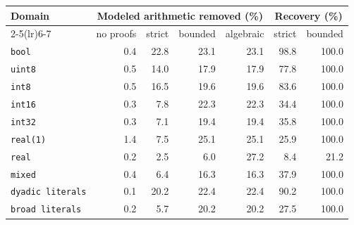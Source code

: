 \begin{tabular}{lrrrrrr}
\toprule
Domain & \multicolumn{4}{c}{Modeled arithmetic removed (\%)} & \multicolumn{2}{c}{Recovery (\%)}\\
\cmidrule(lr){2-5}\cmidrule(lr){6-7}
 & no proofs & strict & bounded & algebraic & strict & bounded\\
\midrule
\texttt{bool} & 0.4 & 22.8 & 23.1 & 23.1 & 98.8 & 100.0\\
\texttt{uint8} & 0.5 & 14.0 & 17.9 & 17.9 & 77.8 & 100.0\\
\texttt{int8} & 0.5 & 16.5 & 19.6 & 19.6 & 83.6 & 100.0\\
\texttt{int16} & 0.3 & 7.8 & 22.3 & 22.3 & 34.4 & 100.0\\
\texttt{int32} & 0.3 & 7.1 & 19.4 & 19.4 & 35.8 & 100.0\\
\texttt{real(1)} & 1.4 & 7.5 & 25.1 & 25.1 & 25.9 & 100.0\\
\texttt{real} & 0.2 & 2.5 & 6.0 & 27.2 & 8.4 & 21.2\\
\texttt{mixed} & 0.4 & 6.4 & 16.3 & 16.3 & 37.9 & 100.0\\
\texttt{dyadic literals} & 0.1 & 20.2 & 22.4 & 22.4 & 90.2 & 100.0\\
\texttt{broad literals} & 0.2 & 5.7 & 20.2 & 20.2 & 27.5 & 100.0\\
\bottomrule
\end{tabular}
